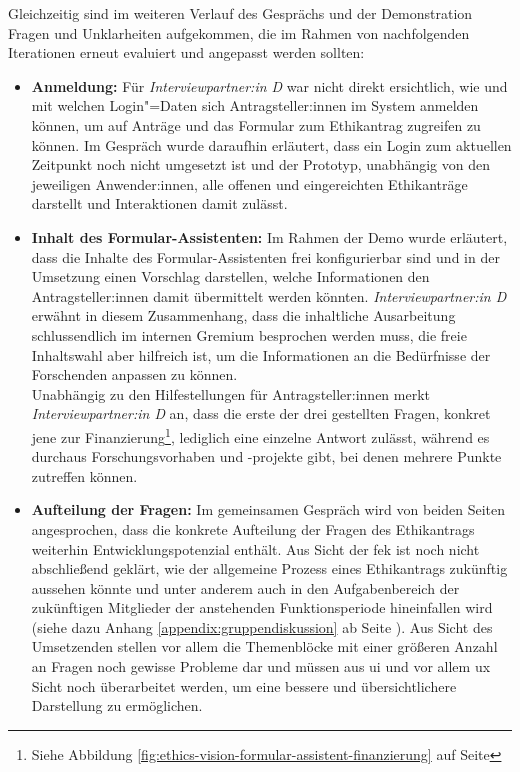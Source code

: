 \documentclass[a4paper,12pt,twoside]{scrreprt}
\begin{document}
Gleichzeitig sind im weiteren Verlauf des Gesprächs und der Demonstration Fragen und Unklarheiten aufgekommen, die im Rahmen von nachfolgenden Iterationen erneut evaluiert und angepasst werden sollten:
\begin{itemize}
    \item \textbf{Anmeldung:} Für \textit{Interviewpartner:in D} war nicht direkt ersichtlich, wie und mit welchen Login"=Daten sich Antragsteller:innen im System anmelden können, um auf Anträge und das Formular zum Ethikantrag zugreifen zu können. Im Gespräch wurde daraufhin erläutert, dass ein Login zum aktuellen Zeitpunkt noch nicht umgesetzt ist und der Prototyp, unabhängig von den jeweiligen Anwender:innen, alle offenen und eingereichten Ethikanträge darstellt und Interaktionen damit zulässt.
    \item \textbf{Inhalt des Formular-Assistenten:} Im Rahmen der Demo wurde erläutert, dass die Inhalte des Formular-Assistenten frei konfigurierbar sind und in der Umsetzung einen Vorschlag darstellen, welche Informationen den Antragsteller:innen damit übermittelt werden könnten. \textit{Interviewpartner:in D} erwähnt in diesem Zusammenhang, dass die inhaltliche Ausarbeitung schlussendlich im internen Gremium besprochen werden muss, die freie Inhaltswahl aber hilfreich ist, um die Informationen an die Bedürfnisse der Forschenden anpassen zu können.\\
    Unabhängig zu den Hilfestellungen für Antragsteller:innen merkt \textit{Interviewpartner:in D} an, dass die erste der drei gestellten Fragen, konkret jene zur Finanzierung\footnote{Siehe Abbildung \ref{fig:ethics-vision-formular-assistent-finanzierung} auf Seite \pageref{fig:ethics-vision-formular-assistent-finanzierung}}, lediglich eine einzelne Antwort zulässt, während es durchaus Forschungsvorhaben und -projekte gibt, bei denen mehrere Punkte zutreffen können.
    \item \textbf{Aufteilung der Fragen:} Im gemeinsamen Gespräch wird von beiden Seiten angesprochen, dass die konkrete Aufteilung der Fragen des Ethikantrags weiterhin Entwicklungspotenzial enthält. Aus Sicht der \ac{fek} ist noch nicht abschließend geklärt, wie der allgemeine Prozess eines Ethikantrags zukünftig aussehen könnte und unter anderem auch in den Aufgabenbereich der zukünftigen Mitglieder der anstehenden Funktionsperiode hineinfallen wird (siehe dazu Anhang \ref{appendix:gruppendiskussion} ab Seite \pageref{appendix:gruppendiskussion}). Aus Sicht des Umsetzenden stellen vor allem die Themenblöcke mit einer größeren Anzahl an Fragen noch gewisse Probleme dar und müssen aus \ac{ui} und vor allem \ac{ux} Sicht noch überarbeitet werden, um eine bessere und übersichtlichere Darstellung zu ermöglichen.

\end{itemize}
\end{document}
